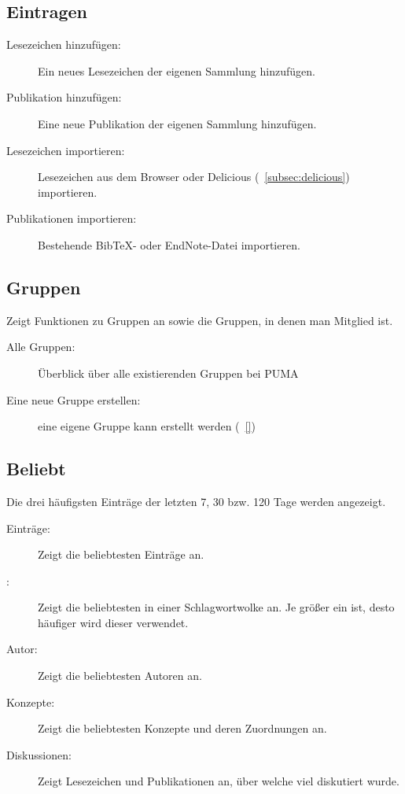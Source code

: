 \subsection{Eintragen}
\label{subsec:eintragen}
\begin{description}
    \item [Lesezeichen hinzufügen:] Ein neues Lesezeichen der eigenen Sammlung hinzufügen.  
    \item [Publikation hinzufügen:] Eine neue Publikation der eigenen Sammlung hinzufügen. 
    \item [Lesezeichen importieren:] Lesezeichen aus dem Browser oder Delicious (~\autoref{subsec:delicious}) importieren.
    \item [Publikationen importieren:] Bestehende BibTeX- oder EndNote-Datei importieren.
\end{description}

\subsection{Gruppen}
\label{subsec:gruppen}
Zeigt Funktionen zu Gruppen an sowie die Gruppen, in denen man Mitglied ist.
\begin{description}
    \item [Alle Gruppen:] Überblick über alle existierenden Gruppen bei PUMA
    \item [Eine neue Gruppe erstellen:] eine eigene Gruppe kann erstellt werden (~\autoref{})
\end{description}
\subsection{Beliebt}
\label{subsec:beliebt}
Die drei häufigsten Einträge der letzten 7, 30 bzw. 120 Tage werden angezeigt.
\begin{description}
    \item [Einträge:] Zeigt die beliebtesten Einträge an.
    \item [\tags:] Zeigt die beliebtesten \tags in einer Schlagwortwolke an. Je größer ein \tag ist, desto häufiger wird dieser verwendet.
    \item [Autor:] Zeigt die beliebtesten Autoren an.
    \item [Konzepte:] Zeigt die beliebtesten Konzepte und deren Zuordnungen an. 
    \item [Diskussionen:] Zeigt Lesezeichen und Publikationen an, über welche viel diskutiert wurde. 
\end{description}
